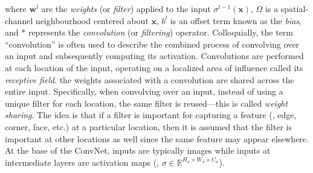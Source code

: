 where $\mathbf{w}^l$ are the \emph{weights} (or \emph{filter}) applied to the input $\sigma^{l-1}(\mathbf{x})$, $\Omega$ is a spatial-channel neighbourhood centered about $\mathbf{x}$, $b^l$ is an offset term known as the \emph{bias}, and $\ast$ represents the \emph{convolution} (or \emph{filtering}) operator. Colloquially, the term ``convolution'' is often used to describe the combined process of convolving over an input and subsequently computing its activation. Convolutions are performed at each location of the input, operating on a localized area of influence called its \emph{receptive field}.  the weights associated with a convolution are shared across the entire input. Specifically, when convolving over an input, instead of using a unique filter for each location, the same filter is reused---this is called \emph{weight sharing}. The idea is that if a filter is important for capturing a feature (\eg, edge, corner, face, etc.) at a particular location, then it is assumed that the filter is important at other locations as well since the same feature may appear elsewhere.
At the base of the ConvNet, inputs are typically images while inputs at intermediate layers are activation maps (\eg, $\sigma \in \mathbb{R}^{H_\sigma \times W_\sigma \times C_\sigma}$). 

\subsubsection{}


\subsubsection{}

